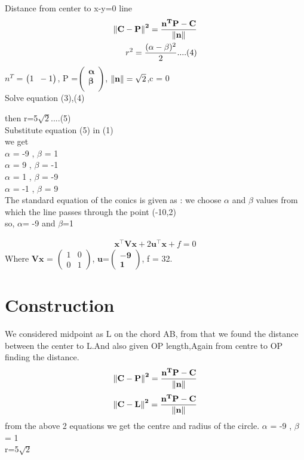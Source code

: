\documentclass[10pt, a4paper]{article}
\let\vec\mathbf
\begin{document}
Distance from center to x-y=0 line\\
\begin{align*}
\vec{\norm{C-P}^2} = \vec{\frac{n^TP-C}{\norm{n}}}\\
r^2 = \frac{(\alpha-\beta)^2}{2}....(4)\\
\end{align*}
$n^T$ = $\vec{\begin{pmatrix}1 \hspace{0.2cm}-1 \end{pmatrix}}$, 
P =$\vec{ \begin{pmatrix}\alpha\\ \beta\\ \end{pmatrix}}$, 
$\vec{\norm{n}} = \sqrt{2}$,c = 0\\
Solve equation (3),(4)\\
\begin{center}
then r=5$\sqrt{2}$....(5)\\
Substitute equation (5) in (1)\\
we get\\
$\alpha$ = -9 , $\beta$ = 1\\
$\alpha$ =  9 , $\beta$ = -1\\
$\alpha$ =  1 , $\beta$ = -9\\
$\alpha$ = -1 , $\beta$ = 9\\
The standard equation of the conics is given as :
we choose $\alpha$ and $\beta$ values from which the line passes through the point (-10,2)\\
so, $\alpha$= -9 and $\beta$=1
 
\begin{align}
\vec{x}^{\top}\vec{V}\vec{x}+2\vec{u}^{\top}\vec{x}+f=0
\end{align}
Where
$\vec{Vx}$ = 
$\begin{pmatrix}
1 & 0\\
0 & 1
\end{pmatrix}$,
$\vec{u}$=$\vec{ \begin{pmatrix}-9 \\1 \end{pmatrix}}$, 
f = 32.
\end{center}
\section{Construction}
We considered midpoint as L on the chord AB, from that we found the distance between the center to L.And also given OP length,Again from centre to OP finding the distance. 
\begin{align*}
\vec{\norm{C-P}^2} = \vec{\frac{n^TP-C}{\norm{n}}}\\
\end{align*}
\begin{align*}
\vec{\norm{C-L}^2} = \vec{\frac{n^TP-C}{\norm{n}}}\\
\end{align*}
from the above 2 equations we get the centre and radius of the circle.
$\alpha$ = -9 , $\beta$ = 1\\
r=5$\sqrt{2}$
\end{document}
